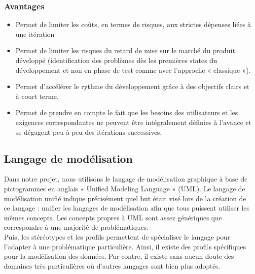 \documentclass[12 pt]{report}
\begin{document}
\subsubsection{Avantages }
\begin{itemize}[font=\color{green} \Large, label=]

\item Permet de limiter les coûts, en termes de risques, aux strictes dépenses liées à une itération
\item 	Permet de limiter les risques du retard de mise sur le marché du produit développé (identification des problèmes dès les premières states du développement et non en phase de test comme avec l’approche « classique »).
\item Permet d’accélérer le rythme du développement grâce à des objectifs clairs et à court terme.
\item Permet de prendre en compte le fait que les besoins des utilisateurs et les exigences correspondantes ne peuvent être intégralement définies à l’avance et se dégagent peu à peu des itérations successives.  
\end{itemize}
\subsection{Langage de modélisation }
     Dans notre projet, nous utilisons le langage de modélisation graphique à base de pictogrammes en anglais « Unified Modeling Language » (UML). Le langage de modélisation unifié indique précisément quel but était visé lors de la création de ce langage : unifier les langages de modélisation afin que tous puissent utiliser les mêmes concepts. Les concepts propres à UML sont assez génériques que correspondre à une majorité de problématiques.
\\

 Puis, les stéréotypes et les profils permettent de spécialiser le langage pour l’adapter à une problématique particulière. Ainsi, il existe des profils spécifiques pour la modélisation des données. Par contre, il existe sans aucun doute des domaines très particulières où d’autres langages sont bien plus adoptés.
\end{document}
